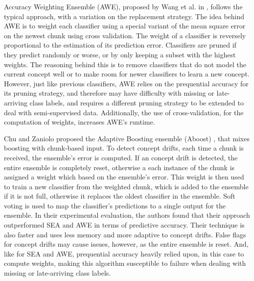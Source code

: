 Accuracy Weighting Ensemble (AWE), proposed by Wang et al. in \cite{wang2003mining}, follows the typical approach, with a variation on the replacement strategy. The idea behind AWE is to weight each classifier using a special variant of the mean square error on the newest chunk using cross validation. The weight of a classifier is reversely proportional to the estimation of its prediction error. Classifiers are pruned if they predict randomly or worse, or by only keeping a subset with the highest weights. The reasoning behind this is to remove classifiers that do not model the current concept well or to make room for newer classifiers to learn a new concept. However, just like previous classifiers, AWE relies on the prequential accuracy for its pruning strategy, and therefore may have difficulty with missing or late-arriving class labels, and requires a different pruning strategy to be extended to deal with semi-supervised data. Additionally, the use of cross-validation, for the computation of weights, increases AWE's runtime.

Chu and Zaniolo proposed the Adaptive Boosting ensemble (Aboost) \cite{wang2003mining}, that mixes boosting with chunk-based input. To detect concept drifts, each time a chunk is received, the ensemble's error is computed. If an concept drift is detected, the entire ensemble is completely reset, otherwise a each instance of the chunk is assigned a weight which based on the ensemble's error. This weight is then used to train a new classifier from the weighted chunk, which is added to the ensemble if it is not full, otherwise it replaces the oldest classifier in the ensemble. Soft voting is used to map the classifier's predictions to a single output for the ensemble. In their experimental evaluation, the authors found that their approach outperformed SEA \cite{street2001streaming} and AWE \cite{wang2003mining} in terms of predictive accuracy. Their technique is also faster and uses less memory and more adaptive to concept drifts. False flags for concept drifts may cause issues, however, as the entire ensemble is reset. And, like for SEA and AWE, prequential accuracy heavily relied upon, in this case to compute weights, making this algorithm susceptible to failure when dealing with missing or late-arriving class labels.

